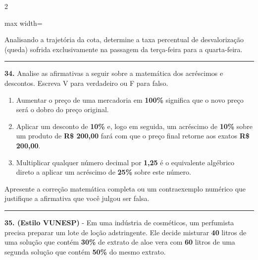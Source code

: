 \documentclass[twoside, 10pt, a4paper]{article}
\newlength{\espacoPreQuestao}
\newlength{\espacoQuestao}
\begin{document}
\begin{multicols*}{2}
\begin{center}
\begin{adjustbox}{max width=\linewidth}
\end{adjustbox}
\end{center}

Analisando a trajetória da cota, determine a taxa percentual de desvalorização (queda) sofrida exclusivamente na passagem da terça-feira para a quarta-feira.
\par\vspace{\espacoQuestao}

\noindent\textcolor{CorLinha}{\rule{\linewidth}{0.5pt}} 
\par\vspace{\espacoPreQuestao}
\textbf{34.} Analise as afirmativas a seguir sobre a matemática dos acréscimos e descontos. Escreva V para verdadeiro ou F para falso.
\begin{enumerate}[label=\Roman*.]
    \item Aumentar o preço de uma mercadoria em \textbf{100\%} significa que o novo preço será o dobro do preço original.
    \item Aplicar um desconto de \textbf{10\%} e, logo em seguida, um acréscimo de \textbf{10\%} sobre um produto de \textbf{R\$ 200,00} fará com que o preço final retorne aos exatos \textbf{R\$ 200,00}.
    \item Multiplicar qualquer número decimal por \textbf{1,25} é o equivalente algébrico direto a aplicar um acréscimo de \textbf{25\%} sobre este número.
\end{enumerate}
Apresente a correção matemática completa ou um contraexemplo numérico que justifique a afirmativa que você julgou ser falsa.
\par\vspace{\espacoQuestao}

\noindent\textcolor{CorLinha}{\rule{\linewidth}{0.5pt}} 
\par\vspace{\espacoPreQuestao}
\textbf{35. (Estilo VUNESP)} - Em uma indústria de cosméticos, um perfumista precisa preparar um lote de loção adstringente. Ele decide misturar \textbf{40} litros de uma solução que contém \textbf{30\%} de extrato de aloe vera com \textbf{60} litros de uma segunda solução que contém \textbf{50\%} do mesmo extrato. 


\end{multicols*}
\end{document}
